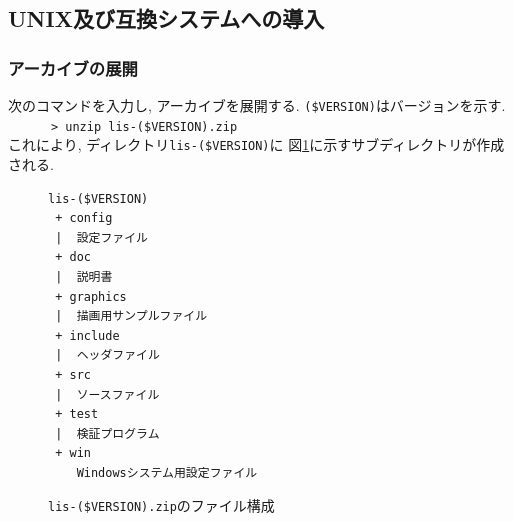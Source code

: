 \documentclass[a4paper]{jarticle}
\begin{document}
\subsection{UNIX及び互換システムへの導入}
\subsubsection{アーカイブの展開}
次のコマンドを入力し, アーカイブを展開する. \verb|($VERSION)|はバージョンを示す. \\
\verb&      > unzip lis-($VERSION).zip &\\
これにより, ディレクトリ{\tt lis-(\$VERSION)}に
図\ref{listargz}に示すサブディレクトリが作成される. 

\begin{figure}[htbp]
\begin{center}
\begin{verbatim}
lis-($VERSION)
 + config
 |  設定ファイル
 + doc
 |  説明書
 + graphics
 |  描画用サンプルファイル
 + include
 |  ヘッダファイル
 + src
 |  ソースファイル
 + test
 |  検証プログラム
 + win
    Windowsシステム用設定ファイル
\end{verbatim}
\end{center}
\caption{{\tt lis-(\$VERSION).zip}のファイル構成}
\label{listargz}
\end{figure}
\end{document}
